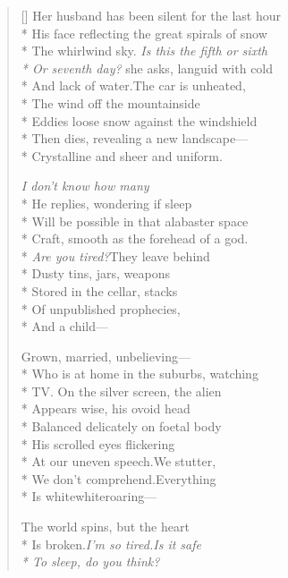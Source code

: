 \label{ch:husband_and_wife_freeze}
\settowidth{\versewidth}{The whirlwind sky. Is this the fifth or sixth}
\begin{verse}[\versewidth]
Her husband has been silent for the last hour\\*
His face reflecting the great spirals of snow\\*
The whirlwind sky. \textit{Is this the fifth or sixth\\*
Or seventh day?} she asks, languid with cold\\*
And lack of water.\qquad The car is unheated,\\*
The wind off the mountainside\\*
Eddies loose snow against the windshield\\*
Then dies, revealing a new landscape---\\*
Crystalline and sheer and uniform.

\textit{I don't know how many}\\*
He replies, wondering if sleep\\*
Will be possible in that alabaster space\\*
Craft, smooth as the forehead of a god.\\*
\textit{Are you tired?}\qquad They leave behind\\*
Dusty tins, jars, weapons\\*
Stored in the cellar, stacks\\*
Of unpublished prophecies,\\*
And a child---

Grown, married, unbelieving---\\*
Who is at home in the suburbs, watching\\*
TV. On the silver screen, the alien\\*
Appears wise, his ovoid head\\*
Balanced delicately on foetal body\\*
His scrolled eyes flickering\\*
At our uneven speech.\qquad We stutter,\\*
We don't comprehend.\qquad Everything\\*
Is white\qquad white\qquad roaring---

The world spins, but the heart\\*
Is broken.\qquad \textit{I'm so tired.\qquad Is it safe\\*
To sleep, do you think?}
\end{verse}
